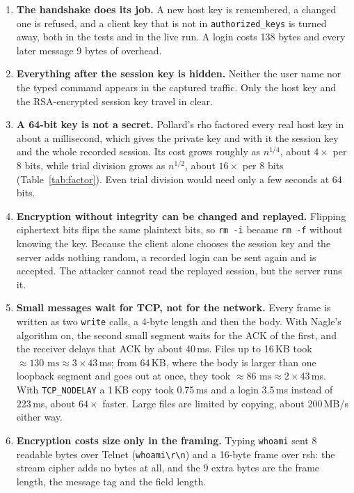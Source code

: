 \documentclass[11pt,a4paper]{article}
\begin{document}
\begin{enumerate}
\item \textbf{The handshake does its job.} A new host key is remembered, a
  changed one is refused, and a client key that is not in
  \texttt{authorized\_keys} is turned away, both in the tests and in the live
  run. A login costs 138 bytes and every later message 9 bytes of overhead.

\item \textbf{Everything after the session key is hidden.} Neither the user name
  nor the typed command appears in the captured traffic. Only the host key and
  the RSA-encrypted session key travel in clear.

\item \textbf{A 64-bit key is not a secret.} Pollard's rho factored every real
  host key in about a millisecond, which gives the private key and with it the
  session key and the whole recorded session. Its cost grows roughly as
  $n^{1/4}$, about $4\times$ per 8 bits, while trial division grows as
  $n^{1/2}$, about $16\times$ per 8 bits (Table~\ref{tab:factor}). Even trial
  division would need only a few seconds at 64 bits.

\item \textbf{Encryption without integrity can be changed and replayed.}
  Flipping ciphertext bits flips the same plaintext bits, so \texttt{rm -i}
  became \texttt{rm -f} without knowing the key. Because the client alone
  chooses the session key and the server adds nothing random, a recorded login
  can be sent again and is accepted. The attacker cannot read the replayed
  session, but the server runs it.

\item \textbf{Small messages wait for TCP, not for the network.} Every frame is
  written as two \texttt{write} calls, a 4-byte length and then the body. With
  Nagle's algorithm on, the second small segment waits for the ACK of the first,
  and the receiver delays that ACK by about 40\,ms. Files up to 16\,KB took
  $\approx 130\text{ ms} \approx 3 \times 43$\,ms; from 64\,KB, where the body is
  larger than one loopback segment and goes out at once, they took
  $\approx 86\text{ ms} \approx 2 \times 43$\,ms. With \texttt{TCP\_NODELAY}
  a 1\,KB copy took 0.75\,ms and a login 3.5\,ms instead of 223\,ms, about
  $64\times$ faster. Large files are limited by copying, about 200\,MB/s either
  way.

\item \textbf{Encryption costs size only in the framing.} Typing
  \texttt{whoami} sent 8 readable bytes over Telnet
  (\texttt{whoami\textbackslash r\textbackslash n}) and a 16-byte frame over
  rsh: the stream cipher adds no bytes at all, and the 9 extra bytes are the
  frame length, the message tag and the field length.


\end{enumerate}
\end{document}
